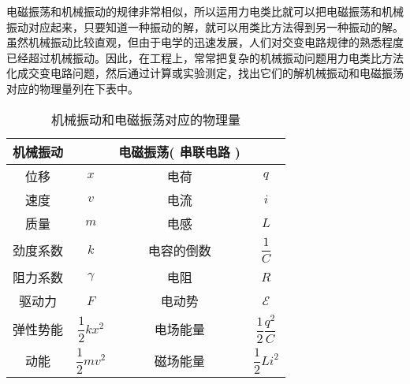 
电磁振荡和机械振动的规律非常相似，所以运用力电类比就可以把电磁振荡和机械振动对应起来，只要知道一种振动的解，就可以用类比方法得到另一种振动的解。虽然机械振动比较直观，但由于电学的迅速发展，人们对交变电路规律的熟悉程度已经超过机械振动。因此，在工程上，常常把复杂的机械振动问题用力电类比方法化成交变电路问题，然后通过计算或实验测定，找出它们的解机械振动和电磁振荡对应的物理量列在下表中。

\begin{table}[ht]
\centering
\caption{机械振动和电磁振荡对应的物理量}\label{tab_MeElec_1}
\begin{tabular}{cccc}
\hline  机械振动  & &  电磁振荡(  串联电路 ) &\\ \hline  位移  & $x$ &  电荷  & $q$ \\ \hline  速度  & $v $&  电流  & $i$ \\ \hline  质量  & $m$ &  电感  & $L$ \\ \hline  劲度系数  & $k$ &  电容的倒数  & $\dfrac1C$ \\ \hline  阻力系数  & $\gamma$ &  电阻  & $R$  \\ \hline  驱动力  &$F$ &  电动势  & $\mathscr E$  \\ \hline  弹性势能  &  $\dfrac12 k x^2$ &  电场能量  & $\dfrac12 \dfrac{q^2}C$ \\ \hline  动能  & $\dfrac12 m v^2$ &  磁场能量  &  $\dfrac12 L i^2$ \\ \hline
\end{tabular}
\end{table}
